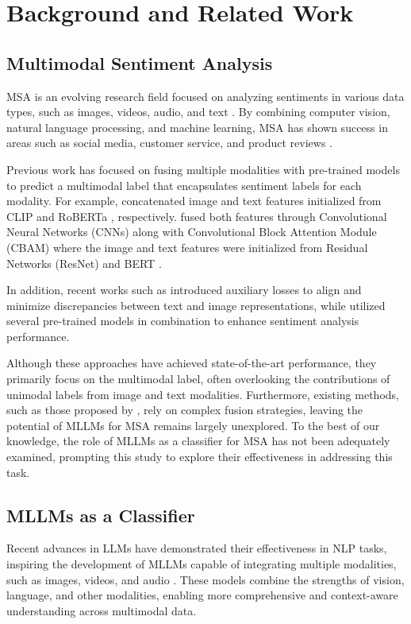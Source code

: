 \section{Background and Related Work}
\subsection{Multimodal Sentiment Analysis}
MSA is an evolving research field focused on analyzing sentiments in various data types, such as images, videos, audio, and text \citep{cheema-etal-2021-fair}. By combining computer vision, natural language processing, and machine learning, MSA has shown success in areas such as social media, customer service, and product reviews \citep{gandhi-etal-2023-multi}.

Previous work has focused on fusing multiple modalities with pre-trained models to predict a multimodal label that encapsulates sentiment labels for each modality. For example, \citet{cheema-etal-2021-fair} concatenated image and text features initialized from CLIP \citep{radford-etal-2021-learning} and RoBERTa \citep{liu-etal-2019-roberta}, respectively. \citet{wang-etal-2023-exploring} fused both features through Convolutional Neural Networks (CNNs) along with Convolutional Block Attention Module (CBAM) \citep{woo-etal-2018-cbam} where the image and text features were initialized from Residual Networks (ResNet) \citep{he-etal-2015-deep} and BERT \citep{devlin-etal-2019-bert}. 

In addition, recent works such as \citet{sanchez-villegas-etal-2024-improving} introduced auxiliary losses to align and minimize discrepancies between text and image representations, while \citet{chen-etal-2024-holistic} utilized several pre-trained models in combination to enhance sentiment analysis performance.

Although these approaches have achieved state-of-the-art performance, they primarily focus on the multimodal label, often overlooking the contributions of unimodal labels from image and text modalities. Furthermore, existing methods, such as those proposed by \citet{wang-etal-2023-exploring,chen-etal-2024-holistic}, rely on complex fusion strategies, leaving the potential of MLLMs for MSA remains largely unexplored. To the best of our knowledge, the role of MLLMs as a classifier for MSA has not been adequately examined, prompting this study to explore their effectiveness in addressing this task.

\subsection{MLLMs as a Classifier}
Recent advances in LLMs have demonstrated their effectiveness in NLP tasks, inspiring the development of MLLMs capable of integrating multiple modalities, such as images, videos, and audio \citep{naveed-etal-2023-comprehensive}. These models combine the strengths of vision, language, and other modalities, enabling more comprehensive and context-aware understanding across multimodal data. 

